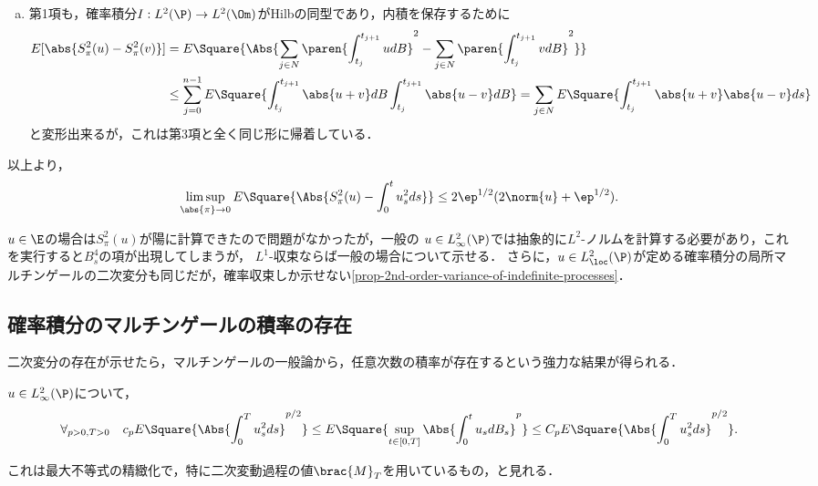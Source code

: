 \documentclass[uplatex,dvipdfmx]{jsreport}
\begin{document}
\begin{Proof}
\begin{description}
\begin{enumerate}[(a)]
\begin{align*}
                <\sqrt{\ep}\norm{u+v}_{L^2_t(\P)}\\
                &\le\ep^{1/2}(2\norm{u}_{L^2_t(\P)}+\norm{u-v}_{L^2_t(\P)})=\sqrt{\ep}(2\norm{u}_{L^2_t(\P)}+\sqrt{\ep}).
            \end{align*}
            \item 第1項も，確率積分$I:L^2(\P)\to L^2(\Om)$がHilbの同型であり，内積を保存するために
            \begin{align*}
                E[\abs{S^2_\pi(u)-S^2_\pi(v)}]&=E\Square{\Abs{\sum_{j\in N}\paren{\int^{t_{j+1}}_{t_j}udB}^2-\sum_{j\in N}\paren{\int^{t_{j+1}}_{t_j}vdB}^2}}\\
                &\le\sum_{j=0}^{n-1}E\Square{\int^{t_{j+1}}_{t_j}\abs{u+v}dB\int^{t_{j+1}}_{t_j}\abs{u-v}dB}=\sum_{j\in N}E\Square{\int^{t_{j+1}}_{t_j}\abs{u+v}\abs{u-v}ds}
            \end{align*}
            と変形出来るが，これは第3項と全く同じ形に帰着している．
        \end{enumerate}
        以上より，
        \[\limsup_{\abs{\pi}\to0}E\Square{\Abs{S^2_\pi(u)-\int^t_0u^2_sds}}\le 2\ep^{1/2}(2\norm{u}+\ep^{1/2}).\]
    \end{description}
\end{Proof}
\begin{remark}
    $u\in\E$の場合は$S^2_\pi(u)$が陽に計算できたので問題がなかったが，一般の
    $u\in L^2_\infty(\P)$では抽象的に$L^2$-ノルムを計算する必要があり，これを実行すると$B_s^4$の項が出現してしまうが，
    $L^1$-収束ならば一般の場合について示せる．
    さらに，$u\in L^2_\loc(\P)$が定める確率積分の局所マルチンゲールの二次変分も同じだが，確率収束しか示せない\ref{prop-2nd-order-variance-of-indefinite-processes}．
\end{remark}

\subsection{確率積分のマルチンゲールの積率の存在}

\begin{tcolorbox}[colframe=ForestGreen, colback=ForestGreen!10!white,breakable,colbacktitle=ForestGreen!40!white,coltitle=black,fonttitle=\bfseries\sffamily,
title=]
    二次変分の存在が示せたら，マルチンゲールの一般論から，任意次数の積率が存在するという強力な結果が得られる．
\end{tcolorbox}

\begin{corollary}\label{cor-Burkholder-for-the-martingale-of-SI}
    $u\in L^2_\infty(\P)$について，
    \[\forall_{p>0,T>0}\quad c_pE\Square{\Abs{\int^T_0u^2_sds}^{p/2}}\le E\Square{\sup_{t\in[0,T]}\Abs{\int^t_0u_sdB_s}^p}\le C_pE\Square{\Abs{\int^T_0u^2_sds}^{p/2}}.\]
\end{corollary}
\begin{remarks}
    これは最大不等式の精緻化で，特に二次変動過程の値$\brac{M}_T$を用いているもの，と見れる．
\end{remarks}
\end{document}
